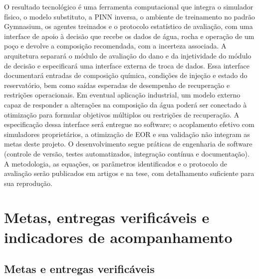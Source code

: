 \documentclass[10pt,a4paper]{article}
\newcommand{\itemedital}[1]{}
\begin{document}
O resultado tecnológico é uma ferramenta computacional que integra o simulador físico, o
modelo substituto, a PINN inversa, o ambiente de treinamento no padrão Gymnasium, os
agentes treinados e o protocolo estatístico de avaliação, com uma interface de apoio à
decisão que recebe os dados de água, rocha e operação de um poço e devolve a composição
recomendada, com a incerteza associada. A arquitetura separará o módulo de avaliação do dano e da injetividade do módulo de decisão e especificará uma interface externa de troca de dados. Essa interface documentará entradas de composição química, condições de injeção e estado do reservatório, bem como saídas esperadas de desempenho de recuperação e restrições operacionais. Em eventual aplicação industrial, um modelo externo capaz de responder a alterações na composição da água poderá ser conectado à otimização para formular objetivos múltiplos ou restrições de recuperação. A especificação dessa interface será entregue no software; o acoplamento efetivo com simuladores proprietários, a otimização de EOR e sua validação não integram as metas deste projeto. O desenvolvimento segue
práticas de engenharia de software (controle de versão, testes automatizados, integração
contínua e documentação). A metodologia, as equações, os parâmetros identificados e o
protocolo de avaliação serão publicados em artigos e na tese, com detalhamento suficiente
para sua reprodução.

\section{Metas, entregas verificáveis e indicadores de acompanhamento}\itemedital{2.16 XIII, XVI; 6.3.4}

\subsection{Metas e entregas verificáveis}\itemedital{2.16 XIII}
\end{document}
